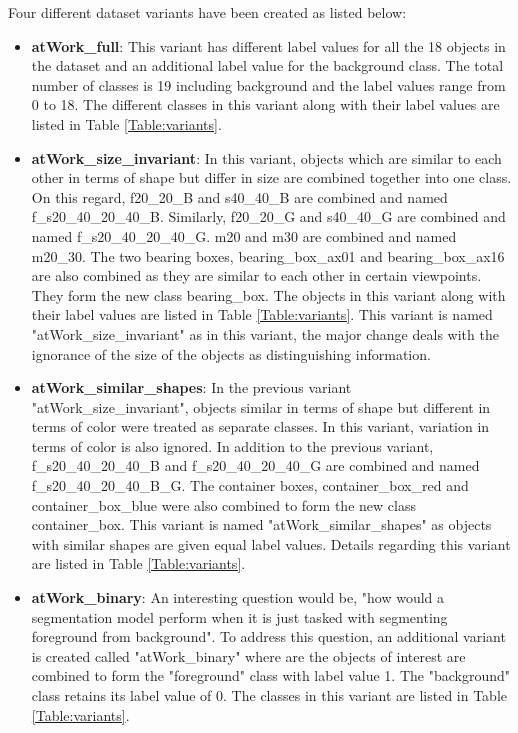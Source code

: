 	Four different dataset variants have been created as listed below:
	\begin{itemize}
		\item \textbf{atWork\_full}: This variant has different label values for all the 18 objects in the dataset and an additional label value for the background class. The total number of classes is 19 including background and the label values range from 0 to 18. The different classes in this variant along with their label values are listed in Table \ref{Table:variants}.
		\item \textbf{atWork\_size\_invariant}: In this variant, objects which are similar to each other in terms of shape but differ in size are combined together into one class. On this regard, f20\_20\_B and s40\_40\_B are combined and named f\_s20\_40\_20\_40\_B. Similarly, f20\_20\_G and s40\_40\_G are combined and named f\_s20\_40\_20\_40\_G. m20 and m30 are combined and named m20\_30. The two bearing boxes, bearing\_box\_ax01 and bearing\_box\_ax16 are also combined as they are similar to each other in certain viewpoints. They form the new class bearing\_box. The objects in this variant along with their label values are listed in Table \ref{Table:variants}. This variant is named "atWork\_size\_invariant" as in this variant, the major change deals with the ignorance of the size of the objects as distinguishing information.
		\item \textbf{atWork\_similar\_shapes}: In the previous variant "atWork\_size\_invariant", objects similar in terms of shape but different in terms of color were treated as separate classes. In this variant, variation in terms of color is also ignored. In addition to the previous variant, f\_s20\_40\_20\_40\_B and f\_s20\_40\_20\_40\_G are combined and named f\_s20\_40\_20\_40\_B\_G. The container boxes, container\_box\_red and container\_box\_blue were also combined to form the new class container\_box. This variant is named "atWork\_similar\_shapes" as objects with similar shapes are given equal label values. Details regarding this variant are listed in Table \ref{Table:variants}.
		\item \textbf{atWork\_binary}: An interesting question would be, "how would a segmentation model perform when it is just tasked with segmenting foreground from background". To address this question, an additional variant is created called "atWork\_binary" where are the objects of interest are combined to form the "foreground" class with label value 1. The "background" class retains its label value of 0. The classes in this variant are listed in Table \ref{Table:variants}.
		

\end{itemize}
